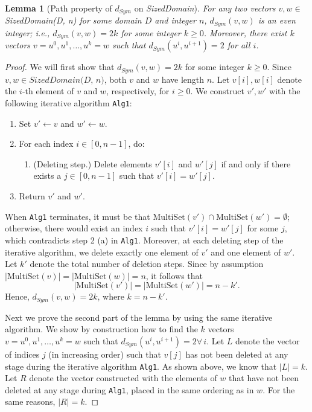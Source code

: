 \documentclass[11pt,a4paper]{article}
\newtheorem{lemma}[theorem]{Lemma}
\theoremstyle{definition}
\newcommand{\MultiSet}{\mathrm{MultiSet}}
\begin{document}
\begin{lemma}[Path property of $d_{Sym}$ on \textit{SizedDomain}]\label{lemma:path1}
    For any two vectors $v, w \in$ \textit{SizedDomain(D, n)} for some domain $D$ and integer $n$, $d_{Sym}(v,w)$ is an even integer; i.e., $d_{Sym}(v,w) = 2k$ for some integer $k \geq 0$. Moreover, there exist $k$ vectors $v=u^0, u^1, \ldots, u^k=w$ such that $d_{Sym}(u^i,u^{i+1})=2$ for all $i$.
\end{lemma}

\begin{proof}
    We will first show that $d_{Sym}(v, w) = 2k$ for some integer $k \geq 0$. Since $v, w \in \textit{SizedDomain(D, n)}$, both $v$ and $w$ have length $n$. Let $v[i], w[i]$ denote the $i$-th element of $v$ and $w$, respectively, for $i \geq 0$. We construct $v', w'$ with the following iterative algorithm \texttt{Alg1}: 
    \begin{enumerate}
        \item Set $v' \leftarrow v$ and $w' \leftarrow w$.
        \item For each index $i \in [0, n-1]$, do:
        \begin{enumerate}
            \item (Deleting step.) Delete elements $v'[i]$ and $w'[j]$ if and only if there exists a $j \in [0, n-1]$ such that $v'[i] = w'[j]$.
        \end{enumerate}
        \item Return $v'$ and $w'$.
    \end{enumerate}
    When \texttt{Alg1} terminates, it must be that $\MultiSet(v') \cap \MultiSet(w') = \emptyset$; otherwise, there would exist an index $i$ such that $v'[i] = w'[j]$ for some $j$, which contradicts step 2 (a) in \texttt{Alg1}. Moreover, at each deleting step of the iterative algorithm, we delete exactly one element of $v'$ and one element of $w'$. Let $k'$ denote the total number of deletion steps. Since by assumption $|\MultiSet(v)| = |\MultiSet(w)| = n$, it follows that
    \[
        |\MultiSet(v')| = |\MultiSet(w')| = n-k'.
    \]
    Hence, $d_{Sym}(v, w) = 2k$, where $k = n-k'$.
    
    Next we prove the second part of the lemma by using the same iterative algorithm. We show by construction how to find the $k$ vectors $v = u^0, u^1, \ldots, u^k = w$ such that $d_{Sym}(u^i, u^{i+1}) = 2 \forall \, i$. Let $L$ denote the vector of indices $j$ (in increasing order) such that $v[j]$ has not been deleted at any stage during the iterative algorithm \texttt{Alg1}. As shown above, we know that $|L| = k$. Let $R$ denote the vector constructed with the elements of $w$ that have not been deleted at any stage during \texttt{Alg1}, placed in the same ordering as in $w$. For the same reasons, $|R| = k$.
    

\end{proof}
\end{document}
